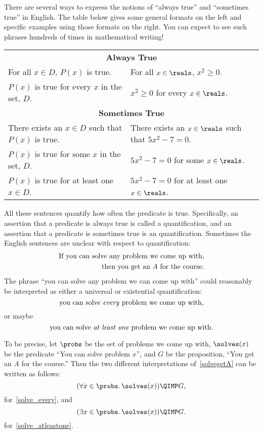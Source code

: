 There are several ways to express the notions of ``always true'' and
``sometimes true'' in English.  The table below gives some general
formats on the left and specific examples using those formats on the
right.  You can expect to see such phrases hundreds of times in
mathematical writing!
%
\begin{center}
\begin{tabular}{ll}
\multicolumn{2}{c}{\textbf{Always True}} \\[1ex]
For all $x \in D$, $P(x)$ is true. & For all $x \in \reals$, $x^2 \geq 0$. \\
$P(x)$ is true for every $x$ in the set, $D$. & $x^2 \geq 0$ for every $x \in \reals$. \\[2ex]
\multicolumn{2}{c}{\textbf{Sometimes True}} \\[1ex]
There exists an $x \in D$ such that $P(x)$ is true. & There exists an $x \in \reals$ such that $5x^2 - 7 = 0$.\\
$P(x)$ is true for some $x$ in the set, $D$. & $5x^2 - 7 = 0$ for some $x \in \reals$.\\
$P(x)$ is true for at least one $x \in D$. & $5x^2-7=0$ for at least one $x \in \reals$.
\end{tabular}
\end{center}

All these sentences quantify how often the predicate is true.
Specifically, an assertion that a predicate is always true is called a
 quantification, and an assertion that a predicate is
sometimes true is an  quantification.  Sometimes the
English sentences are unclear with respect to quantification:
%
\begin{align}
  \text{If you can solve any problem we come up with,}\notag\\
  \text{then you get an \emph{A} for the course.}\label{solvegetA}
\end{align}
%
The phrase ``you can solve any problem we can come up with'' could
reasonably be interpreted as either a universal or existential
quantification:
\begin{equation}\label{solve_every}
\text{you can solve \emph{every} problem we come up with,}
\end{equation}
or maybe
\begin{equation}\label{solve_atleastone}
\text{you can solve \emph{at least one} problem we come up with.}
\end{equation}

\iffalse
In any case, notice that this quantified phrase appears inside a
larger if-then statement.  This is quite normal; quantified statements
are themselves propositions and can be combined
with \QAND, \QOR, \QIMPLIES, etc., just like any other proposition.
\fi
To be precise, let $\probs$ be the set of problems we come up with,
$\solves(x)$ be the predicate ``You can solve problem $x$'', and $G$
be the proposition, ``You get an \emph{A} for the course.''  Then the
two different interpretations of~\eqref{solvegetA}
can be written as follows:
%
\[
(\forall x \in \probs.\, \solves(x)) \QIMP G,
\]
for~\eqref{solve_every}, and
\[
(\exists x \in \probs.\, \solves(x)) \QIMP G.
\]
for~\eqref{solve_atleastone}.

